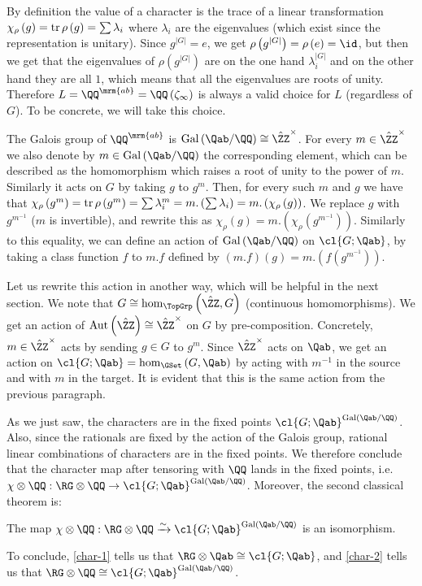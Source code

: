 By definition the value of a character is the trace of a linear transformation $\chi_\rho\left(g\right) = \operatorname{tr} \rho\left(g\right) = \sum \lambda_i$ where $\lambda_i$ are the eigenvalues (which exist since the representation is unitary).
Since $g^{\left|G\right|} = e$, we get $\rho\left(g^{\left|G\right|}\right) = \rho\left(e\right) = \id$, but then we get that the eigenvalues of $\rho\left(g^{\left|G\right|}\right)$ are on the one hand $\lambda_i^{\left|G\right|}$ and on the other hand they are all $1$, which means that all the eigenvalues are roots of unity.
Therefore $L = \QQ^\mrm{ab} = \QQ\left(\zeta_\infty\right)$ is always a valid choice for $L$ (regardless of $G$).
To be concrete, we will take this choice.

The Galois group of $\QQ^\mrm{ab}$ is $\Gal\left(\Qab / \QQ\right) \cong {\hat\ZZ}^\times$.
For every $m \in {\hat\ZZ}^\times$ we also denote by $m \in \Gal\left(\Qab / \QQ\right)$ the corresponding element, which can be described as the homomorphism which raises a root of unity to the power of $m$.
Similarly it acts on $G$ by taking $g$ to $g^m$.
Then, for every such $m$ and $g$ we have that
$
\chi_\rho\left(g^m\right)
= \operatorname{tr} \rho\left(g^m\right)
= \sum \lambda_i^m
= m. \left(\sum \lambda_i\right)
= m. \left(\chi_\rho\left(g\right)\right)
$.
We replace $g$ with $g^{m^{-1}}$ ($m$ is invertible), and rewrite this as $\chi_\rho\left(g\right) = m. \left(\chi_\rho\left(g^{m^{-1}}\right)\right)$.
Similarly to this equality, we can define an action of $\Gal\left(\Qab / \QQ\right)$ on $\cl{G; \Qab}$, by taking a class function $f$ to $m.f$ defined by $\left(m.f\right)\left(g\right) = m. \left(f\left(g^{m^{-1}}\right)\right)$.

Let us rewrite this action in another way, which will be helpful in the next section.
We note that $G \cong \hom_{\TopGrp}\left(\hat\ZZ, G\right)$ (continuous homomorphisms).
We get an action of $\aut\left(\hat\ZZ\right) \cong {\hat\ZZ}^\times$ on $G$ by pre-composition.
Concretely, $m \in {\hat\ZZ}^\times$ acts by sending $g \in G$ to $g^m$.
Since ${\hat\ZZ}^\times$ acts on $\Qab$, we get an action on $\cl{G; \Qab} = \hom_{\GSet}\left(G,  \Qab\right)$ by acting with $m^{-1}$ in the source and with $m$ in the target.
It is evident that this is the same action from the previous paragraph.

As we just saw, the characters are in the fixed points $\cl{G; \Qab}^{\Gal\left(\Qab / \QQ\right)}$.
Also, since the rationals are fixed by the action of the Galois group, rational linear combinations of characters are in the fixed points.
We therefore conclude that the character map after tensoring with $\QQ$ lands in the fixed points, i.e. $\chi \otimes \QQ: \RG \otimes \QQ \to \cl{G; \Qab}^{\Gal\left(\Qab / \QQ\right)}$.
Moreover, the second classical theorem is:

\begin{theorem}\label{char-2}
	The map $\chi \otimes \QQ: \RG \otimes \QQ \xrightarrow{\sim} \cl{G; \Qab}^{\Gal\left(\Qab / \QQ\right)}$ is an isomorphism.
\end{theorem}

To conclude, \ref{char-1} tells us that $\RG \otimes \Qab \cong \cl{G; \Qab}$, and \ref{char-2} tells us that $\RG \otimes \QQ \cong \cl{G; \Qab}^{\Gal\left(\Qab / \QQ\right)}$.
